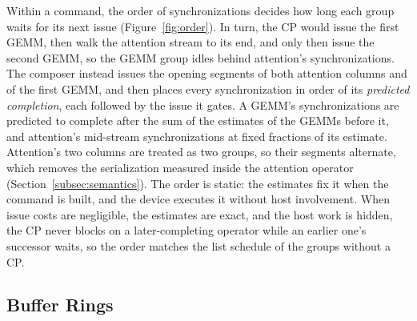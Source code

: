 Within a command, the order of synchronizations decides how long each group waits for its next issue (Figure~\ref{fig:order}).
In turn, the CP would issue the first GEMM, then walk the attention stream to its end, and only then issue the second GEMM, so the GEMM group idles behind attention's synchronizations.
The composer instead issues the opening segments of both attention columns and of the first GEMM, and then places every synchronization in order of its \emph{predicted completion}, each followed by the issue it gates.
A GEMM's synchronizations are predicted to complete after the sum of the estimates of the GEMMs before it, and attention's mid-stream synchronizations at fixed fractions of its estimate.
Attention's two columns are treated as two groups, so their segments alternate, which removes the serialization measured inside the attention operator (Section~\ref{subsec:semantics}).
The order is static: the estimates fix it when the command is built, and the device executes it without host involvement.
When issue costs are negligible, the estimates are exact, and the host work is hidden, the CP never blocks on a later-completing operator while an earlier one's successor waits, so the order matches the list schedule of the groups without a CP.

\subsection{Buffer Rings}
\label{subsec:rings}

